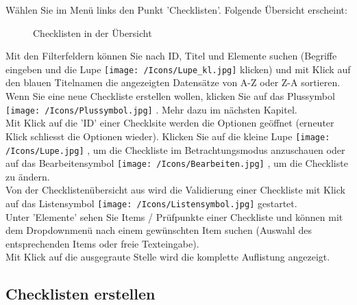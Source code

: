 Wählen Sie im Menü links den Punkt 'Checklisten'. Folgende Übersicht erscheint:

\begin{figure}[H]
\caption{Checklisten in der Übersicht}
\end{figure}

Mit den Filterfeldern können Sie nach ID, Titel und Elemente suchen (Begriffe eingeben und die Lupe \texttt{[image: /Icons/Lupe\_kl.jpg]} klicken) und mit Klick auf den blauen Titelnamen die angezeigten Datensätze von A-Z oder Z-A sortieren.\\
Wenn Sie eine neue Checkliste erstellen wollen, klicken Sie auf das Plussymbol \texttt{[image: /Icons/Plussymbol.jpg]} . Mehr dazu im nächsten Kapitel.\\
Mit Klick auf die 'ID'  einer Checklsite werden die Optionen geöffnet (erneuter Klick schliesst die Optionen wieder). Klicken Sie auf die kleine Lupe \texttt{[image: /Icons/Lupe.jpg]} , um die Checkliste im Betrachtungsmodus anzuschauen oder auf das Bearbeitensymbol \texttt{[image: /Icons/Bearbeiten.jpg]} , um die Checkliste zu ändern.\\
Von der Checklistenübersicht aus wird die Validierung einer Checkliste mit Klick auf das Listensymbol \texttt{[image: /Icons/Listensymbol.jpg]}  gestartet.\\
Unter 'Elemente' sehen Sie Items / Prüfpunkte einer Checkliste und können mit dem Dropdownmenü nach einem gewünschten Item suchen (Auswahl des entsprechenden Items oder freie Texteingabe).\\
Mit Klick auf die ausgegraute Stelle wird die komplette Auflistung angezeigt.

\subsection{Checklisten erstellen}

